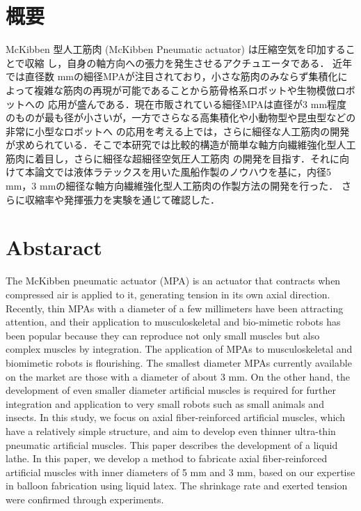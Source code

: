 \newpage
\section*{概要}
McKibben 型人工筋肉 (McKibben Pneumatic actuator) は圧縮空気を印加することで収縮 し，自身の軸方向への張力を発生させるアクチュエータである．
近年では直径数 mmの細径MPAが注目されており，小さな筋肉のみならず集積化によって複雑な筋肉の再現が可能であることから筋骨格系ロボットや生物模倣ロボットへの
応用が盛んである．現在市販されている細径MPAは直径が3 mm程度のものが最も径が小さいが，一方でさらなる高集積化や小動物型や昆虫型などの非常に小型なロボットへ
の応用を考える上では，さらに細径な人工筋肉の開発が求められている．そこで本研究では比較的構造が簡単な軸方向繊維強化型人工筋肉に着目し，さらに細径な超細径空気圧人工筋肉
の開発を目指す．それに向けて本論文では液体ラテックスを用いた風船作製のノウハウを基に，内径5 mm，3 mmの細径な軸方向繊維強化型人工筋肉の作製方法の開発を行った．
さらに収縮率や発揮張力を実験を通じて確認した．

\newpage
\section*{Abstaract}
The McKibben pneumatic actuator (MPA) is an actuator that contracts when compressed air is applied to it, generating tension in its own axial direction.
Recently, thin MPAs with a diameter of a few millimeters have been attracting attention, and their application to musculoskeletal and bio-mimetic robots has been popular because they can reproduce not only small muscles but also complex muscles by integration.
The application of MPAs to musculoskeletal and biomimetic robots is flourishing. The smallest diameter MPAs currently available on the market are those with a diameter of about 3 mm.
On the other hand, the development of even smaller diameter artificial muscles is required for further integration and application to very small robots such as small animals and insects. In this study, we focus on axial fiber-reinforced artificial muscles, which have a relatively simple structure, and aim to develop even thinner ultra-thin pneumatic artificial muscles.
This paper describes the development of a liquid lathe. In this paper, we develop a method to fabricate axial fiber-reinforced artificial muscles with inner diameters of 5 mm and 3 mm, based on our expertise in balloon fabrication using liquid latex.
The shrinkage rate and exerted tension were confirmed through experiments.

